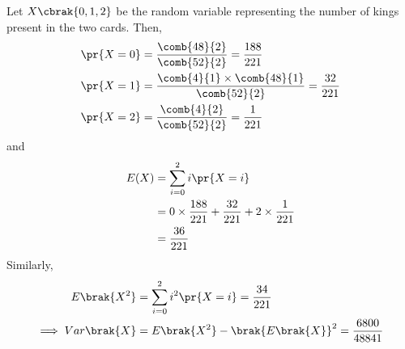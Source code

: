 Let $X \cbrak{ 0, 1, 2 }$ be the  random variable representing the number of kings present in the two cards.
%
Then,
%
\begin{align}
\pr{X=0} &= \frac{\comb{48}{2}}{\comb{52}{2}} = \frac{188}{221} 
\\
\pr{X=1} &= \frac{\comb{4}{1} \times \comb{48}{1}}{\comb{52}{2}} = \frac{32}{221} 
\\
\pr{X=2} &= \frac{\comb{4}{2}}{\comb{52}{2}} = \frac{1}{221}
\end{align}
and
\begin{align}
E(X) &= \sum_{i=0}^{2} i\pr{X=i} 
\\
&= 0\times\frac{188}{221} + \frac{32}{221} + 2\times\frac{1}{221}
\\
&= \frac{36}{221}
\end{align}
Similarly,
%
\begin{align}
E\brak{X^2} &= \sum_{i=0}^{2} i^2\pr{X=i} = \frac{34}{221}
\\
\implies Var\brak{X}&=  E\brak{X^2} - \brak{E\brak{X} }^2 = \frac{6800}{48841}
\end{align}
